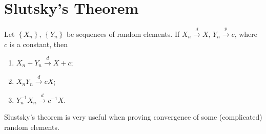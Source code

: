 \section{Slutsky's Theorem}
Let $\left\{ X_n \right\}$, $\left\{ Y_n \right\}$ be sequences of random elements. If $X_n\xrightarrow{d} X$, $Y_n\xrightarrow{p}c$, where $c$ is a constant, then
\begin{enumerate}
  \item $X_n+Y_n\xrightarrow{d}X+c$;
  \item $X_n Y_n\xrightarrow{d}cX$;
  \item $Y_n^{-1}X_n \xrightarrow{d}c^{-1}X$.
\end{enumerate}

Slustsky's theorem is very useful when proving convergence of some (complicated) random elements.

